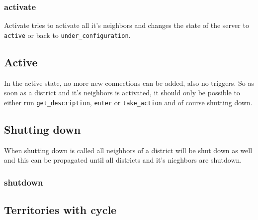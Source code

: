 \documentclass[12pt,a4paper]{article}
\begin{document}
\subsubsection{activate}
Activate tries to activate all it's neighbors and changes the state of the server to \texttt{active} or back to \texttt{under\_configuration}.

\subsection{Active}
In the active state, no more new connections can be added, also no triggers.
So as soon as a district and it's neighbors is activated, it should only be possible to either run \texttt{get\_description}, \texttt{enter} or \texttt{take\_action} and of course shutting down.

\subsection{Shutting down}
When shutting down is called all neighbors of a district will be shut down as well and this can be propagated until all districts and it's nieghbors are shutdown.

\subsubsection{shutdown}

\subsection{Territories with cycle}

\end{document}
